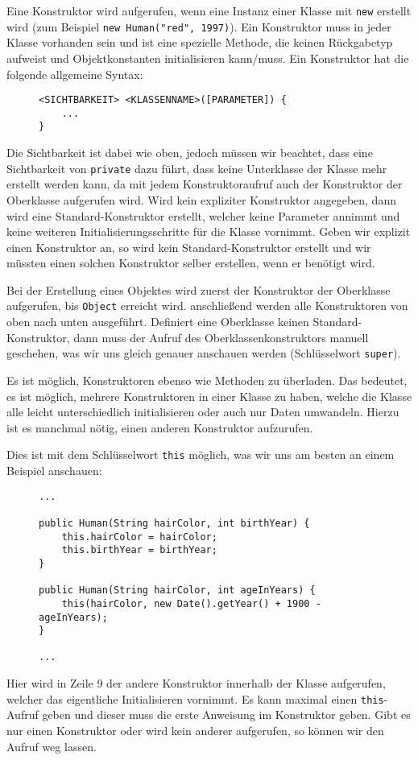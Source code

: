 		Eine Konstruktor wird aufgerufen, wenn eine Instanz einer Klasse mit \lstinline|new| erstellt wird (zum Beispiel \lstinline|new Human("red", 1997)|). Ein Konstruktor muss in jeder Klasse vorhanden sein und ist eine spezielle Methode, die keinen Rückgabetyp aufweist und Objektkonstanten initialisieren kann/muss. Ein Konstruktor hat die folgende allgemeine Syntax:
		\begin{figure}[H]
			\centering
			\begin{lstlisting}
<SICHTBARKEIT> <KLASSENNAME>([PARAMETER]) {
	...
}
\end{lstlisting}
		\end{figure}
		Die Sichtbarkeit ist dabei wie oben, jedoch müssen wir beachtet, dass eine Sichtbarkeit von \lstinline|private| dazu führt, dass keine Unterklasse der Klasse mehr erstellt werden kann, da mit jedem Konstruktoraufruf auch der Konstruktor der Oberklasse aufgerufen wird. Wird kein expliziter Konstruktor angegeben, dann wird eine Standard-Konstruktor erstellt, welcher keine Parameter annimmt und keine weiteren Initialisierungsschritte für die Klasse vornimmt. Geben wir explizit einen Konstruktor an, so wird kein Standard-Konstruktor erstellt und wir müssten einen solchen Konstruktor selber erstellen, wenn er benötigt wird.
		
		Bei der Erstellung eines Objektes wird zuerst der Konstruktor der Oberklasse aufgerufen, bis \lstinline|Object| erreicht wird. anschließend werden alle Konstruktoren von oben nach unten ausgeführt. Definiert eine Oberklasse keinen Standard-Konstruktor, dann muss der Aufruf des Oberklassenkonstruktors manuell geschehen, was wir uns gleich genauer anschauen werden (Schlüsselwort \lstinline|super|).
		
		Es ist möglich, Konstruktoren ebenso wie Methoden zu überladen. Das bedeutet, es ist möglich, mehrere Konstruktoren in einer Klasse zu haben, welche die Klasse alle leicht unterschiedlich initialisieren oder auch nur Daten umwandeln. Hierzu ist es manchmal nötig, einen anderen Konstruktor aufzurufen.
		
		Dies ist mit dem Schlüsselwort \lstinline|this| möglich, was wir uns am besten an einem Beispiel anschauen:
		\begin{figure}[H]
			\centering
			\begin{lstlisting}
...

public Human(String hairColor, int birthYear) {
	this.hairColor = hairColor;
	this.birthYear = birthYear;
}

public Human(String hairColor, int ageInYears) {
	this(hairColor, new Date().getYear() + 1900 - ageInYears);
}

...
\end{lstlisting}
		\end{figure}
		Hier wird in Zeile 9 der andere Konstruktor innerhalb der Klasse aufgerufen, welcher das eigentliche Initialisieren vornimmt. Es kann maximal einen \lstinline|this|-Aufruf geben und dieser muss die erste Anweisung im Konstruktor geben. Gibt es nur einen Konstruktor oder wird kein anderer aufgerufen, so können wir den Aufruf weg lassen.
		
